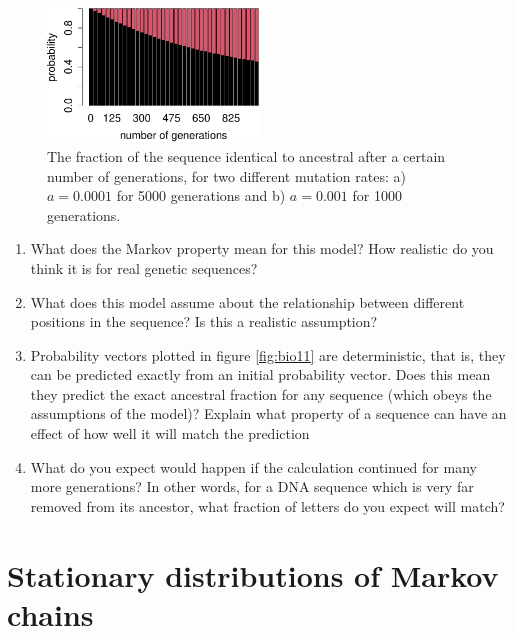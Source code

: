 \documentclass[
  letterpaper,
  DIV=11,
  numbers=noendperiod]{scrreprt}
\begin{document}
\begin{figure}

{\centering \includegraphics[width=0.5\textwidth,height=\textheight]{./markov_evol_files/figure-pdf/bio11-2.pdf}

}

\caption{The fraction of the sequence identical to ancestral after a
certain number of generations, for two different mutation rates: a)
\(a=0.0001\) for 5000 generations and b) \(a=0.001\) for 1000
generations.}

\end{figure}

\begin{enumerate}
\def\labelenumi{\arabic{enumi}.}
\item
  What does the Markov property mean for this model? How realistic do
  you think it is for real genetic sequences?
\item
  What does this model assume about the relationship between different
  positions in the sequence? Is this a realistic assumption?
\item
  Probability vectors plotted in figure \ref{fig:bio11} are
  deterministic, that is, they can be predicted exactly from an initial
  probability vector. Does this mean they predict the exact ancestral
  fraction for any sequence (which obeys the assumptions of the model)?
  Explain what property of a sequence can have an effect of how well it
  will match the prediction
\item
  What do you expect would happen if the calculation continued for many
  more generations? In other words, for a DNA sequence which is very far
  removed from its ancestor, what fraction of letters do you expect will
  match?
\end{enumerate}


\hypertarget{stationary-distributions-of-markov-chains}{%
\chapter{Stationary distributions of Markov
chains}\label{stationary-distributions-of-markov-chains}}
\end{document}
